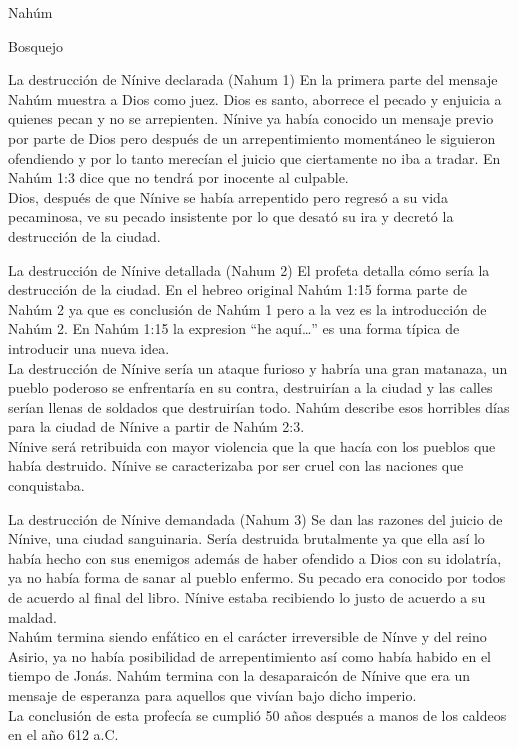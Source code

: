 \begin{section}{Nahúm}
\begin{enumerate}
	\end{enumerate}
	\begin{subsection}{Bosquejo}
		\begin{subsubsection}{La destrucción de Nínive declarada (Nahum 1)}
			En la primera parte del mensaje Nahúm muestra a Dios como juez. Dios es santo, aborrece el pecado y enjuicia a quienes pecan y no se arrepienten. Nínive ya había conocido un mensaje previo por parte de Dios pero después de un arrepentimiento momentáneo le siguieron ofendiendo y por lo tanto merecían el juicio que ciertamente no iba a tradar. En Nahúm 1:3 dice que no tendrá por inocente al culpable.\\
			Dios, después de que Nínive se había arrepentido pero regresó a su vida pecaminosa, ve su pecado insistente por lo que desató su ira y decretó la destrucción de la ciudad.
		\end{subsubsection}
		\newpage
		\begin{subsubsection}{La destrucción de Nínive detallada (Nahum 2)}
			El profeta detalla cómo sería la destrucción de la ciudad. En el hebreo original Nahúm 1:15 forma parte de Nahúm 2 ya que es conclusión de Nahúm 1 pero a la vez es la introducción de Nahúm 2. En Nahúm 1:15  la expresion ``he aquí\ldots'' es una forma típica de introducir una nueva idea.\\
			La destrucción de Nínive sería un ataque furioso y habría una gran matanaza, un pueblo poderoso se enfrentaría en su contra, destruirían a la ciudad y las calles serían llenas de soldados que destruirían todo. Nahúm describe esos horribles días para la ciudad de Nínive a partir de Nahúm 2:3.\\
			Nínive será retribuida con mayor violencia que la que hacía con los pueblos que había destruido. Nínive se caracterizaba por ser cruel con las naciones que conquistaba.
		\end{subsubsection}
		\begin{subsubsection}{La destrucción de Nínive demandada (Nahum 3)}
			Se dan las razones del juicio de Nínive, una ciudad sanguinaria. Sería destruida brutalmente ya que ella así lo había hecho con sus enemigos además de haber ofendido a Dios con su idolatría, ya no había forma de sanar al pueblo enfermo. Su pecado era conocido por todos de acuerdo al final del libro. Nínive estaba recibiendo lo justo de acuerdo a su maldad. \\
			Nahúm termina siendo enfático en el carácter irreversible de Nínve y del reino Asirio, ya no había posibilidad de arrepentimiento así como había habido en el tiempo de Jonás. Nahúm termina con la desaparaicón de Nínive que era un mensaje de esperanza para aquellos que vivían bajo dicho imperio.\\
			La conclusión de esta profecía se cumplió 50 años después a manos de los caldeos en el año 612 a.C.
		\end{subsubsection}
	\end{subsection}
\end{section}
%


